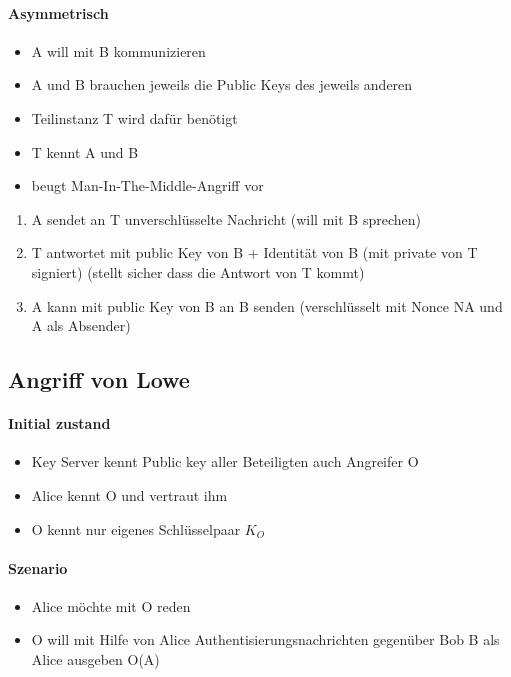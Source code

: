 \documentclass{scrartcl}
\begin{document}
\paragraph*{Asymmetrisch}
\begin{itemize}
  \item A will mit B kommunizieren
  \item A und B brauchen jeweils die Public Keys des jeweils anderen
  \item Teilinstanz T wird dafür benötigt
  \item T kennt A und B
  \item beugt Man-In-The-Middle-Angriff vor
\end{itemize}

\begin{enumerate}
  \item A sendet an T unverschlüsselte Nachricht (will mit B sprechen)
  \item T antwortet mit public Key von B + Identität von B (mit private von T
    signiert) (stellt sicher dass die Antwort von T kommt)
  \item A kann mit public Key von B an B senden (verschlüsselt mit Nonce NA und
    A als Absender)
\end{enumerate}

\subsection*{Angriff von Lowe}
\paragraph*{Initial zustand}
\begin{itemize}
\item Key Server kennt Public key aller Beteiligten auch Angreifer O
\item Alice kennt O und vertraut ihm
\item O kennt nur eigenes Schlüsselpaar $K_O$
\end{itemize}

\paragraph*{Szenario}
\begin{itemize}
\item Alice möchte mit O reden
\item O will mit Hilfe von Alice Authentisierungsnachrichten gegenüber Bob B als Alice ausgeben O(A)
\end{itemize}
\end{document}
